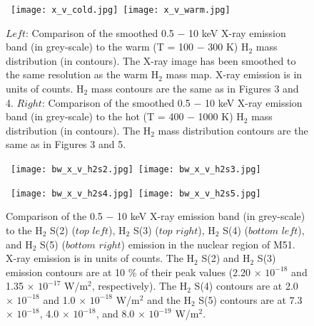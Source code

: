 \documentclass[manuscript]{aastex}
\begin{document}
\clearpage

\begin{figure}[!t]
\centerline{\hbox{ \hspace{0.0in} 
\texttt{[image: x\_v\_cold.jpg]}
\hspace{0.1in}
\texttt{[image: x\_v\_warm.jpg]}}}
\caption{$Left$:  Comparison of the smoothed 0.5 $-$ 10 keV X-ray emission band (in grey-scale) to the warm (T = 100 $-$ 300 K) $\mathrm{H_2}$ mass distribution (in contours).   The X-ray image has been smoothed to the same resolution as the warm $\mathrm{H_2}$ mass map.  X-ray emission is in units of counts.  $\mathrm{H_2}$ mass contours are the same as in Figures 3 and 4.  $Right$: Comparison of the smoothed 0.5 $-$ 10 keV X-ray emission band (in grey-scale) to the hot (T = 400 $-$ 1000 K) $\mathrm{H_2}$ mass distribution (in contours).  The $\mathrm{H_2}$ mass distribution contours are the same as in Figures 3 and 5.\label{fig12}}
\end{figure}

\clearpage

\begin{figure}[!h]
\centerline{\hbox{ \hspace{0.0in} 
\texttt{[image: bw\_x\_v\_h2s2.jpg]}
\hspace{0.1in}
\texttt{[image: bw\_x\_v\_h2s3.jpg]}}}
\end{figure}

\begin{figure}[!h]
\centerline{\hbox{\hspace{0.0in}
\texttt{[image: bw\_x\_v\_h2s4.jpg]}
\hspace{0.1in}
\texttt{[image: bw\_x\_v\_h2s5.jpg]}}}
\caption{Comparison of the 0.5 $-$ 10 keV X-ray emission band (in grey-scale) to the $\mathrm{H_2}$ S(2) ($top$ $left$), $\mathrm{H_2}$ S(3) ($top$ $right$), $\mathrm{H_2}$ S(4) ($bottom$ $left$), and $\mathrm{H_2}$ S(5) ($bottom$ $right$) emission in the nuclear region of M51.  X-ray emission is in units of counts.  The $\mathrm{H_2}$ S(2) and $\mathrm{H_2}$ S(3) emission contours are at 10 \% of their peak values (2.20 $\times$ ${10^{-18}}$ and 1.35 $\times$ ${10^{-17}}$ W/$\mathrm{m^2}$, respectively).  The $\mathrm{H_2}$ S(4) contours are at  2.0 $\times$ ${10^{-18}}$ and 1.0 $\times$ ${10^{-18}}$ W/$\mathrm{m^2}$ and the $\mathrm{H_2}$ S(5) contours are at 7.3 $\times$ ${10^{-18}}$, 4.0 $\times$ ${10^{-18}}$, and 8.0 $\times$ ${10^{-19}}$ W/$\mathrm{m^2}$.\label{fig13}}
\end{figure}
\end{document}
